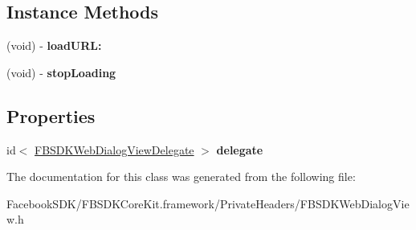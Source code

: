 \subsection*{Instance Methods}
\begin{DoxyCompactItemize}
\item 
\hypertarget{interface_f_b_s_d_k_web_dialog_view_a0b807fb6b299422a2283a0cf49f60706}{(void) -\/ {\bfseries load\-U\-R\-L\-:}}\label{interface_f_b_s_d_k_web_dialog_view_a0b807fb6b299422a2283a0cf49f60706}

\item 
\hypertarget{interface_f_b_s_d_k_web_dialog_view_ad6f2ab9064512a370ed7fef8e6c2d359}{(void) -\/ {\bfseries stop\-Loading}}\label{interface_f_b_s_d_k_web_dialog_view_ad6f2ab9064512a370ed7fef8e6c2d359}

\end{DoxyCompactItemize}
\subsection*{Properties}
\begin{DoxyCompactItemize}
\item 
\hypertarget{interface_f_b_s_d_k_web_dialog_view_a21bdbea4ec07b40fd539c88dfb3dd326}{id$<$ \hyperlink{protocol_f_b_s_d_k_web_dialog_view_delegate-p}{F\-B\-S\-D\-K\-Web\-Dialog\-View\-Delegate} $>$ {\bfseries delegate}}\label{interface_f_b_s_d_k_web_dialog_view_a21bdbea4ec07b40fd539c88dfb3dd326}

\end{DoxyCompactItemize}


The documentation for this class was generated from the following file\-:\begin{DoxyCompactItemize}
\item 
Facebook\-S\-D\-K/\-F\-B\-S\-D\-K\-Core\-Kit.\-framework/\-Private\-Headers/F\-B\-S\-D\-K\-Web\-Dialog\-View.\-h\end{DoxyCompactItemize}
